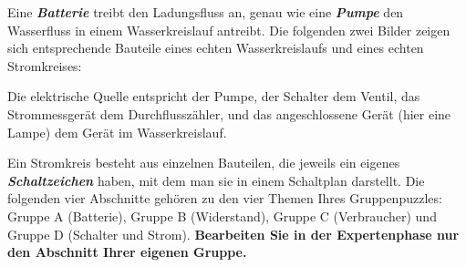\begin{theoriebox}
Eine \textbf{\emph{Batterie}} treibt den Ladungsfluss an, genau wie eine
\textbf{\emph{Pumpe}} den Wasserfluss in einem Wasserkreislauf antreibt.
Die folgenden zwei Bilder zeigen sich entsprechende Bauteile eines echten
Wasserkreislaufs und eines echten Stromkreises:


Die elektrische Quelle entspricht der Pumpe, der Schalter dem Ventil, das
Strommessgerät dem Durchflusszähler, und das angeschlossene Gerät (hier
eine Lampe) dem Gerät im Wasserkreislauf.
\end{theoriebox}

Ein Stromkreis besteht aus einzelnen Bauteilen, die jeweils ein eigenes
\textbf{\emph{Schaltzeichen}} haben, mit dem man sie in einem Schaltplan
darstellt. Die folgenden vier Abschnitte gehören zu den vier Themen Ihres
Gruppenpuzzles: Gruppe A (Batterie), Gruppe B (Widerstand), Gruppe C
(Verbraucher) und Gruppe D (Schalter und Strom). \textbf{Bearbeiten Sie in
der Expertenphase nur den Abschnitt Ihrer eigenen Gruppe.}

